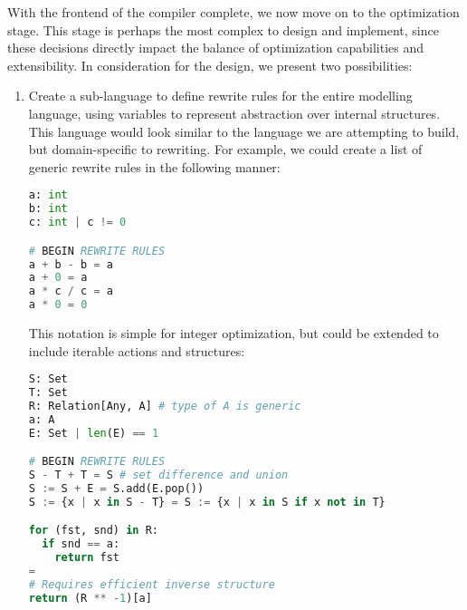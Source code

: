 \documentclass{article}
\begin{document}
With the frontend of the compiler complete, we now move on to the optimization stage. This stage is perhaps the most complex to design and implement, since these decisions directly impact the balance of optimization capabilities and extensibility. In consideration for the design, we present two possibilities:
\begin{enumerate}
  \item Create a sub-language to define rewrite rules for the entire modelling language, using variables to represent abstraction over internal structures. This language would look similar to the language we are attempting to build, but domain-specific to rewriting. For example, we could create a list of generic rewrite rules in the following manner:
  \begin{lstlisting}[language=python]
a: int
b: int
c: int | c != 0

# BEGIN REWRITE RULES
a + b - b = a
a + 0 = a
a * c / c = a
a * 0 = 0
\end{lstlisting}
  This notation is simple for integer optimization, but could be extended to include iterable actions and structures:
  \begin{lstlisting}[language=python]
S: Set
T: Set
R: Relation[Any, A] # type of A is generic
a: A
E: Set | len(E) == 1

# BEGIN REWRITE RULES
S - T + T = S # set difference and union
S := S + E = S.add(E.pop())
S := {x | x in S - T} = S := {x | x in S if x not in T}

for (fst, snd) in R:
  if snd == a:
    return fst
=
# Requires efficient inverse structure
return (R ** -1)[a]


\end{lstlisting}
\end{enumerate}
\end{document}
